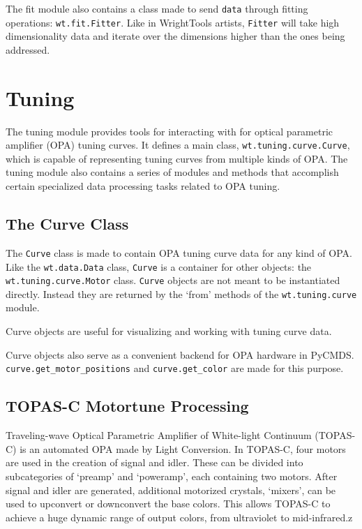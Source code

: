 	The fit module also contains a class made to send \texttt{data} through fitting operations: \texttt{wt.fit.Fitter}. Like in WrightTools artists, \texttt{Fitter} will take high dimensionality data and iterate over the dimensions higher than the ones being addressed.

\pagebreak
\section{Tuning}

The tuning module provides tools for interacting with for optical parametric amplifier (OPA) tuning curves. It defines a main class, \texttt{wt.tuning.curve.Curve}, which is capable of representing tuning curves from multiple kinds of OPA. The tuning module also contains a series of modules and methods that accomplish certain specialized data processing tasks related to OPA tuning.

\subsection{The Curve Class}

The \texttt{Curve} class is made to contain OPA tuning curve data for any kind of OPA. Like the \texttt{wt.data.Data} class, \texttt{Curve} is a container for other objects: the \texttt{wt.tuning.curve.Motor} class. \texttt{Curve} objects are not meant to be instantiated directly. Instead they are returned by the `from' methods of the \texttt{wt.tuning.curve} module. 

Curve objects are useful for visualizing and working with tuning curve data. 

Curve objects also serve as a convenient backend for OPA hardware in PyCMDS. \texttt{curve.get\_motor\_positions} and \texttt{curve.get\_color} are made for this purpose.

\subsection{TOPAS-C Motortune Processing}

Traveling-wave Optical Parametric Amplifier of White-light Continuum (TOPAS-C) is an automated OPA made by Light Conversion. In TOPAS-C, four motors are used in the creation of signal and idler. These can be divided into subcategories of `preamp' and `poweramp', each containing two motors. After signal and idler are generated, additional motorized crystals, `mixers', can be used to upconvert or downconvert the base colors. This allows TOPAS-C to achieve a huge dynamic range of output colors, from ultraviolet to mid-infrared.z

